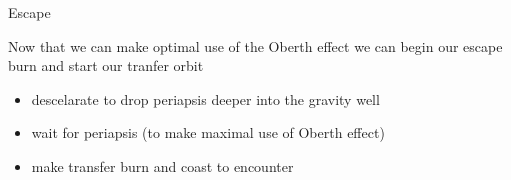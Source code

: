 \begin{frame}[t]{Escape}
    \begin{block}{}
        Now that we can make optimal use of the Oberth effect we can begin our escape burn and start our tranfer orbit
    \end{block}
    \begin{block}{}
        \begin{itemize}
            \item descelarate to drop periapsis deeper into the gravity well
            \item wait for periapsis (to make maximal use of Oberth effect)
            \item make transfer burn and coast to encounter
        \end{itemize}
    \end{block}
\end{frame}
